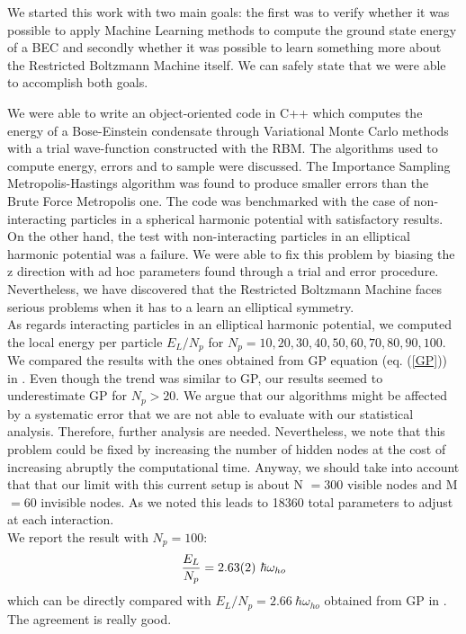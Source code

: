 We started this work with two main goals: the first was to verify whether it was possible to apply Machine Learning methods to compute the ground state energy of a BEC and secondly whether it was possible to learn something more about the Restricted Boltzmann Machine itself. We can safely state that we were able to accomplish both goals. 

We were able to write an object-oriented code in C++ which computes the energy of a Bose-Einstein condensate through Variational Monte Carlo methods with a trial wave-function constructed with the RBM. The algorithms used to compute energy, errors and to sample were discussed. The Importance Sampling Metropolis-Hastings algorithm was found to produce smaller errors than the Brute Force Metropolis one. The code was benchmarked with the case of non-interacting particles in a spherical harmonic potential with satisfactory results. On the other hand, the test with non-interacting particles in an elliptical harmonic potential was a failure. We were able to fix this problem by biasing the z direction with ad hoc parameters found through a trial and error procedure. Nevertheless, we have discovered that the Restricted Boltzmann Machine faces serious problems when it has to a learn an elliptical symmetry. \\
As regards interacting particles in an elliptical harmonic potential, we computed the local energy per particle $E_L/N_p$ for $N_p=10,20,30,40,50,60,70,80,90,100$. We compared the results with the ones obtained from GP equation (eq. (\ref{GP})) in \cite{DalfString}. Even though the trend was similar to GP, our results seemed to underestimate GP for $N_p>20$. We argue that our algorithms might be affected by a systematic error that we are not able to evaluate with our statistical analysis. Therefore, further analysis are needed. Nevertheless, we note that this problem could be fixed by increasing the number of hidden nodes at the cost of increasing abruptly the computational time. Anyway, we should take into account that that our limit with this current setup is about N $=300$ visible nodes and M $=60$ invisible nodes. As we noted this leads to 18360 total parameters to adjust at each interaction. \\
We report the result with $N_p=100$:
\begin{equation*}
	\frac{E_L}{N_p}=\SI{2.63\pm 0.02}{}\ \hbar\omega_{ho}
\end{equation*} 
which can be directly compared with $E_L/N_p=2.66\  \hbar\omega_{ho}$ obtained from GP in \cite{DalfString}. The agreement is really good.

